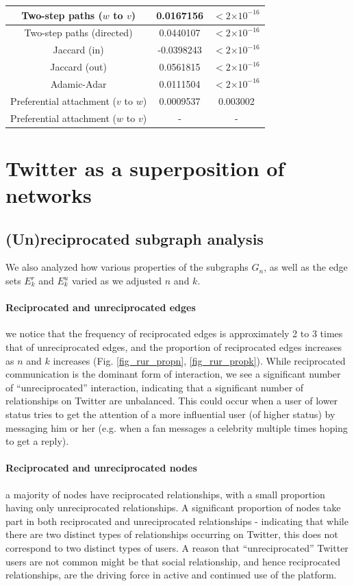 \documentclass[conference]{IEEEtran}
\providecommand{\e}[1]{\ensuremath{\times 10^{#1}}}
\begin{document}
\begin{table}[!t]
\begin{tabular}{|c||c|c|}
Two-step paths ($w$ to $v$)   &    0.0167156  & $< 2 \e{-16} $\\
\hline
Two-step paths (directed)  &   0.0440107 & $< 2 \e{-16} $\\
Jaccard (in) & -0.0398243 & $< 2 \e{-16} $\\
Jaccard (out) &   0.0561815  & $< 2 \e{-16} $\\
Adamic-Adar  & 0.0111504 & $< 2 \e{-16} $ \\
Preferential attachment ($v$ to $w$) & 0.0009537 & 0.003002 \\
Preferential attachment ($w$ to $v$)  &  - & -  \\
\hline
\end{tabular}
\end{table}

\section{Twitter as a superposition of networks}

\subsection{(Un)reciprocated subgraph analysis}
We also analyzed how various properties of the subgraphs $G_n$, as well as the edge sets $E^r_k$ and $E^u_k$ varied as we adjusted $n$ and $k$.

\paragraph{Reciprocated and unreciprocated edges} we notice that the frequency of reciprocated edges is approximately 2 to 3 times that of unreciprocated edges, and the proportion of reciprocated edges increases as $n$ and $k$ increases (Fig. \ref{fig_rur_propn}, \ref{fig_rur_propk}). 
While reciprocated communication is the dominant form of interaction, we see a significant number of ``unreciprocated'' interaction, indicating that a significant number of relationships on Twitter are unbalanced. 
This could occur when a user of lower status tries to get the attention of a more influential user (of higher status) by messaging him or her (e.g. when a fan messages a celebrity multiple times hoping to get a reply). 

\paragraph{Reciprocated and unreciprocated nodes} a majority of nodes have reciprocated relationships, with a small proportion having only unreciprocated relationships. 
A significant proportion of nodes take part in both reciprocated and unreciprocated relationships - indicating that while there are two distinct types of relationships occurring on Twitter, this does not correspond to two distinct types of users. 
A reason that ``unreciprocated'' Twitter users are not common might be that social relationship, and hence reciprocated relationships, are the driving force in active and continued use of the platform. 
\end{document}
